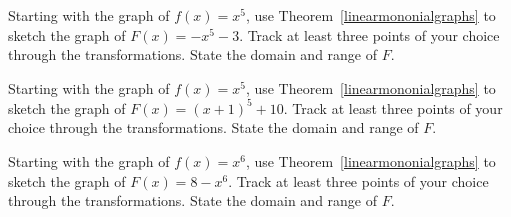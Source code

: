 \documentclass{ximera}
\begin{document}
\begin{problem}
     Starting with the graph of $f(x) = x^5$, use Theorem~\ref{linearmononialgraphs} to sketch the graph of $F(x) = -x^5 - 3$. Track at least three points of your choice through the transformations. State the domain and range of $F$.
\end{problem}

\begin{problem}
     Starting with the graph of $f(x) = x^5$, use Theorem~\ref{linearmononialgraphs} to sketch the graph of $F(x) = (x + 1)^{5} + 10$. Track at least three points of your choice through the transformations. State the domain and range of $F$.
\end{problem}

\begin{problem}\label{polytranslast}
     Starting with the graph of $f(x) = x^6$, use Theorem~\ref{linearmononialgraphs} to sketch the graph of $F(x) = 8 - x^6$. Track at least three points of your choice through the transformations. State the domain and range of $F$.
\end{problem}
\end{document}
